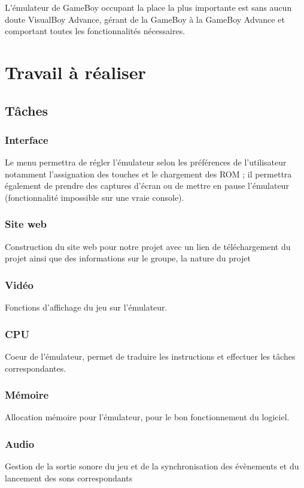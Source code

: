\documentclass[12pt, a4paper]{article}
\begin{document}
L'émulateur de GameBoy occupant la place la plus importante est sans aucun doute VisualBoy Advance, gérant de la GameBoy à la GameBoy Advance et comportant toutes les fonctionnalités nécessaires.


\pagebreak
\section{Travail à réaliser}

\subsection{Tâches}

\bigskip



\subsubsection{Interface}
Le menu permettra de régler l'émulateur selon les préférences de l'utilisateur notamment l'assignation des touches et le chargement des ROM ; il permettra également de prendre des captures d'écran ou de mettre en pause l'émulateur (fonctionnalité impossible sur une vraie console).

\subsubsection{Site web}
Construction du site web pour notre projet avec un lien de téléchargement du projet ainsi que des informations sur le groupe, la nature du projet 

\subsubsection{Vidéo}
Fonctions d'affichage du jeu sur l'émulateur.

\subsubsection{CPU}
Coeur de l’émulateur, permet de traduire les instructions et effectuer les tâches correspondantes.

\subsubsection{Mémoire}
Allocation mémoire pour l’émulateur, pour le bon fonctionnement du logiciel.

\subsubsection{Audio}
Gestion de la sortie sonore du jeu et de la synchronisation des évènements et du lancement des sons correspondants
\end{document}
